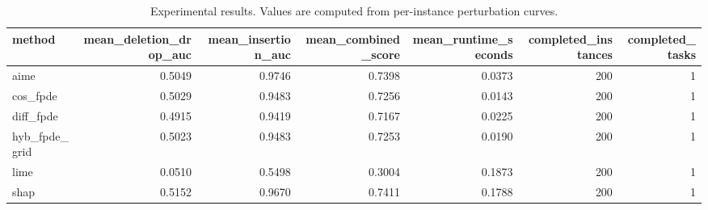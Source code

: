 \begin{table}[t]
\caption{Experimental results. Values are computed from per-instance perturbation curves.}
\label{tab:main_results_computed}
\centering
\begin{tabular}{lrrrrrr}
\toprule
method & mean\_deletion\_drop\_auc & mean\_insertion\_auc & mean\_combined\_score & mean\_runtime\_seconds & completed\_instances & completed\_tasks \\
\midrule
aime & 0.5049 & 0.9746 & 0.7398 & 0.0373 & 200 & 1 \\
cos\_fpde & 0.5029 & 0.9483 & 0.7256 & 0.0143 & 200 & 1 \\
diff\_fpde & 0.4915 & 0.9419 & 0.7167 & 0.0225 & 200 & 1 \\
hyb\_fpde\_grid & 0.5023 & 0.9483 & 0.7253 & 0.0190 & 200 & 1 \\
lime & 0.0510 & 0.5498 & 0.3004 & 0.1873 & 200 & 1 \\
shap & 0.5152 & 0.9670 & 0.7411 & 0.1788 & 200 & 1 \\
\bottomrule
\end{tabular}

\end{table}
